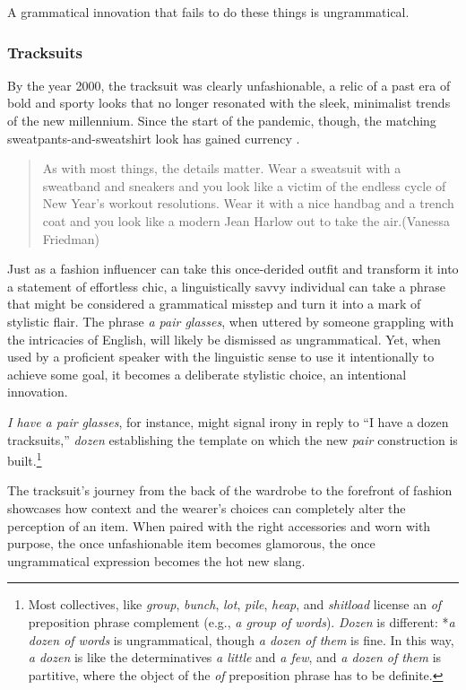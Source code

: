 A grammatical innovation that fails to do these things is ungrammatical.

\subsubsection{Tracksuits}

By the year 2000, the tracksuit was clearly unfashionable, a relic of a past era of bold and sporty looks that no longer resonated with the sleek, minimalist trends of the new millennium. Since the start of the pandemic, though, the matching sweatpants-and-sweatshirt look has gained currency \citep{friedman2024}.

\begin{quote}
    As with most things, the details matter. Wear a sweatsuit with a sweatband and sneakers and you look like a victim of the endless cycle of New Year's workout resolutions. Wear it with a nice handbag and a trench coat and you look like a modern Jean Harlow out to take the air.\hfill(Vanessa Friedman)
\end{quote}

Just as a fashion influencer can take this once-derided outfit and transform it into a statement of effortless chic, a linguistically savvy individual can take a phrase that might be considered a grammatical misstep and turn it into a mark of stylistic flair. The phrase \textit{a pair glasses}, when uttered by someone grappling with the intricacies of English, will likely be dismissed as ungrammatical. Yet, when used by a proficient speaker with the linguistic sense to use it intentionally to achieve some goal, it becomes a deliberate stylistic choice, an intentional innovation.

\textit{I have a pair glasses}, for instance, might signal irony in reply to ``I have a dozen tracksuits,'' \textit{dozen} establishing the template on which the new \textit{pair} construction is built.\footnote{Most collectives, like \textit{group}, \textit{bunch}, \textit{lot}, \textit{pile}, \textit{heap}, and \textit{shitload} license an \textit{of} preposition phrase complement (e.g., \textit{a group of words}). \textit{Dozen} is different: *\textit{a dozen of words} is ungrammatical, though \textit{a dozen of them} is fine. In this way, \textit{a dozen} is like the determinatives \textit{a little} and \textit{a few}, and \textit{a dozen of them} is partitive, where the object of the \textit{of} preposition phrase has to be definite.}

The tracksuit's journey from the back of the wardrobe to the forefront of fashion showcases how context and the wearer's choices can completely alter the perception of an item. When paired with the right accessories and worn with purpose, the once unfashionable item becomes glamorous, the once ungrammatical expression becomes the hot new slang.

